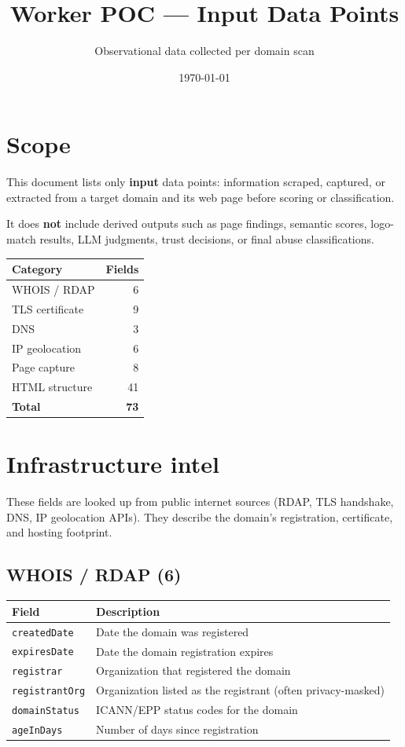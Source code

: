 \documentclass[11pt,a4paper]{article}
\title{\textbf{Worker POC --- Input Data Points}}
\author{Observational data collected per domain scan}
\date{\today}
\begin{document}
\maketitle

\section*{Scope}

This document lists only \textbf{input} data points: information scraped, captured, or extracted from a target domain and its web page before scoring or classification.

It does \textbf{not} include derived outputs such as page findings, semantic scores, logo-match results, LLM judgments, trust decisions, or final abuse classifications.

\begin{center}
\begin{tabular}{@{}lr@{}}
  \toprule
  \textbf{Category} & \textbf{Fields} \\
  \midrule
  WHOIS / RDAP & 6 \\
  TLS certificate & 9 \\
  DNS & 3 \\
  IP geolocation & 6 \\
  Page capture & 8 \\
  HTML structure & 41 \\
  \midrule
  \textbf{Total} & \textbf{73} \\
  \bottomrule
\end{tabular}
\end{center}

\section{Infrastructure intel}

These fields are looked up from public internet sources (RDAP, TLS handshake, DNS, IP geolocation APIs). They describe the domain's registration, certificate, and hosting footprint.

\subsection{WHOIS / RDAP (6)}

\begin{tabular}{@{}p{3.2cm}p{10cm}@{}}
  \toprule
  \textbf{Field} & \textbf{Description} \\
  \midrule
  \texttt{createdDate} & Date the domain was registered \\
  \texttt{expiresDate} & Date the domain registration expires \\
  \texttt{registrar} & Organization that registered the domain \\
  \texttt{registrantOrg} & Organization listed as the registrant (often privacy-masked) \\
  \texttt{domainStatus} & ICANN/EPP status codes for the domain \\
  \texttt{ageInDays} & Number of days since registration \\
  \bottomrule
\end{tabular}
\end{document}
